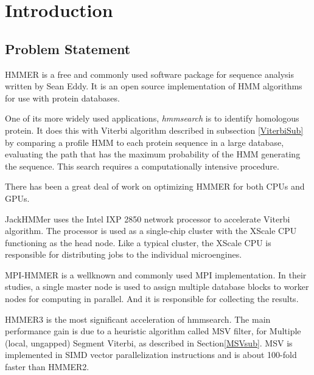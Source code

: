 
\chapter{Introduction} %



\section{Problem Statement}

HMMER \citep{HMMER} is a free and commonly used software package for sequence analysis written by Sean Eddy. 
It is an open source implementation of HMM algorithms for use with protein databases.

One of its more widely used applications, \emph{hmmsearch} is to identify homologous protein. It does this with Viterbi algorithm described in subsection \ref{ViterbiSub} by comparing a profile HMM to each protein sequence in a large database, evaluating the path that has the maximum probability of the HMM generating the sequence.
This search requires a computationally intensive procedure.

There has been a great deal of work on optimizing HMMER for both CPUs and GPUs. 

JackHMMer \citep{Wun} uses the Intel IXP 2850 network processor to accelerate Viterbi algorithm. The processor is used as a single-chip cluster with the XScale CPU functioning as the head node. Like a typical cluster, the XScale CPU is responsible for distributing jobs to the individual microengines. 

MPI-HMMER \citep{Walters2006} is a wellknown and commonly used MPI implementation. In their studies, a single master node is used to assign multiple database blocks to worker nodes for computing in parallel. And it is responsible for collecting the results.

HMMER3 \citep{HMMER3} is the most significant acceleration of hmmsearch. The main performance gain is due to a heuristic algorithm called MSV filter, for Multiple (local, ungapped) Segment Viterbi, as described in Section\ref{MSVsub}. MSV is implemented in SIMD vector parallelization instructions and is about 100-fold faster than HMMER2.

